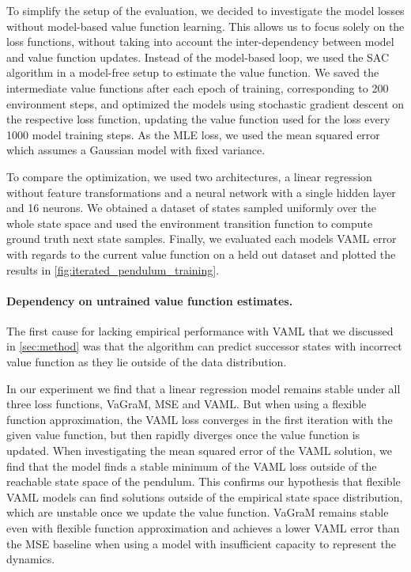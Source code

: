 To simplify the setup of the evaluation, we decided to investigate the model losses without model-based value function learning.
This allows us to focus solely on the loss functions, without taking into account the inter-dependency between model and value function updates.
Instead of the model-based loop, we used the SAC algorithm in a model-free setup to estimate the value function.
We saved the intermediate value functions after each epoch of training, corresponding to 200 environment steps, and optimized the models using stochastic gradient descent on the respective loss function, updating the value function used for the loss every 1000 model training steps.
As the MLE loss, we used the mean squared error which assumes a Gaussian model with fixed variance.

To compare the optimization, we used two architectures, a linear regression without feature transformations and a neural network with a single hidden layer and 16 neurons.
We obtained a dataset of states sampled uniformly over the whole state space and used the environment transition function to compute ground truth next state samples.
Finally, we evaluated each models VAML error with regards to the current value function on a held out dataset and plotted the results in \autoref{fig:iterated_pendulum_training}.

\paragraph{Dependency on untrained value function estimates.}
The first cause for lacking empirical performance with VAML that we discussed in \autoref{sec:method} was that the algorithm can predict successor states with incorrect value function as they lie outside of the data distribution.

In our experiment we find that a linear regression model remains stable under all three loss functions, VaGraM, MSE and VAML.
But when using a flexible function approximation, the VAML loss converges in the first iteration with the given value function, but then rapidly diverges once the value function is updated.
When investigating the mean squared error of the VAML solution, we find that the model finds a stable minimum of the VAML loss outside of the reachable state space of the pendulum.
This confirms our hypothesis that flexible VAML models can find solutions outside of the empirical state space distribution, which are unstable once we update the value function.
VaGraM remains stable even with flexible function approximation and achieves a lower VAML error than the MSE baseline when using a model with insufficient capacity to represent the dynamics.

